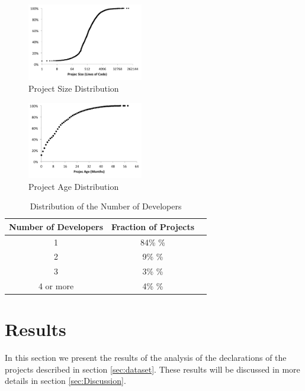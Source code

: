 \documentclass[preprint]{sigplanconf}
\begin{document}
\begin{figure}[ht]
\centering \includegraphics[width=0.45\textwidth]{size_distribution}
\caption{Project Size Distribution}
\label{fig:size_distribution} 
\end{figure}

\begin{figure}[ht]
\centering \includegraphics[width=0.45\textwidth]{age_distribution}
\caption{Project Age Distribution}
\label{fig:age_distribution} 
\end{figure}
 
\begin{table}[ht]
\caption{Distribution of the Number of Developers}


\centering{}%
\begin{tabular}{|c|c|c|}
\hline 
Number of Developers & Fraction of Projects\tabularnewline
\hline 
\hline 
1 & 84\% \%\tabularnewline
\hline 
2 & 9\% \%\tabularnewline
\hline 
3 & 3\% \%\tabularnewline
\hline 
4 or more & 4\% \%\tabularnewline
\hline 
\end{tabular}
\label{tab:number_of_developers}
\end{table}






\section{Results\label{sec:Resultados}}

In this section we present the results of the analysis of the declarations of the projects described in section \ref{sec:dataset}. 
These results will be discussed in more details in section \ref{sec:Discussion}.
\end{document}
